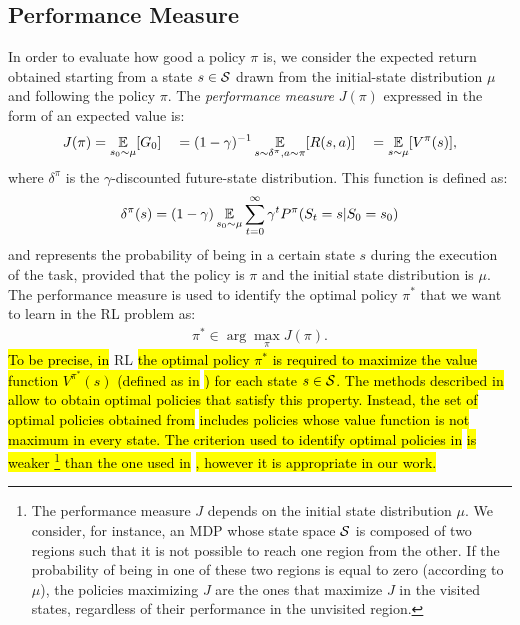 \subsection{Performance Measure}
In order to evaluate how good a policy $\pi$ is, we consider the expected return obtained starting from a state $s \in \mathcal{S}$ drawn from the initial-state distribution $\mu$ and following the policy $\pi$. The \emph{performance measure} $J(\pi)$ expressed in the form of an expected value is:
\begin{align} J(\pi) = \operatorname*{\mathbb{E}}_{s_0\sim\mu}[G_0] \quad = (1 - \gamma)^{-1}\operatorname*{\mathbb{E}}_{s\sim\delta^{\pi}, a \sim \pi}[R(s,a)] \quad = \operatorname*{\mathbb{E}}_{s\sim\mu}[V^{\pi}(s)], \end{align}
where $\delta^{\pi}$ is the $\gamma$-discounted future-state distribution. This function is defined as:
\begin{align} \delta^{\pi}(s) = (1 - \gamma)\operatorname*{\mathbb{E}}_{s_{0}\sim\mu}\sum_{t=0}^{\infty}\gamma^t P^{\pi}(S_t = s|S_0=s_0) \end{align}
and represents the probability of being in a certain state $s$ during the execution of the task, provided that the policy is $\pi$ and the initial state distribution is $\mu$.\\
\newline
The performance measure is used to identify the optimal policy $\pi^{*}$ that we want to learn in the \ac{RL} problem as:
\begin{align} \pi^{*} \in \arg \max_{\pi} J(\pi). \label{eq:optj}\end{align}
\hl{To be precise, in} \ac{RL} \hl{the optimal policy $\pi^{*}$ is required to maximize the value function $V^{\pi^{*}}(s)$ (defined as in} \hl{) for each state $s \in \mathcal{S}$. The methods described in}  \hl{allow to obtain optimal policies that satisfy this property. Instead, the set of optimal policies obtained from } \hl{includes policies whose value function is not maximum in every state. The criterion used to identify optimal policies in}  \hl{is weaker \footnote{The performance measure $J$ depends on the initial state distribution $\mu$. We consider, for instance, an \ac{MDP} whose state space $\mathcal{S}$ is composed of two regions such that it is not possible to reach one region from the other. If the probability of being in one of these two regions is equal to zero (according to $\mu$), the policies maximizing $J$ are the ones that maximize $J$ in the visited states, regardless of their performance in the unvisited region.} than the one used in} \hl{, however it is appropriate in our work.}

